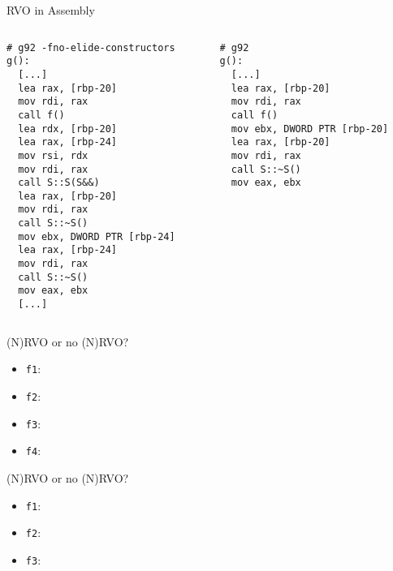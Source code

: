\begin{frame}[fragile]{RVO in Assembly}
    \begin{columns}[t]
        \begin{column}{.45\textwidth}
            \begin{lstlisting}[language={},morekeywords={rdi}]
# g92 -fno-elide-constructors
g():
  [...]
  lea rax, [rbp-20]
  mov rdi, rax
  call f()
  lea rdx, [rbp-20]
  lea rax, [rbp-24]
  mov rsi, rdx
  mov rdi, rax
  call S::S(S&&)
  lea rax, [rbp-20]
  mov rdi, rax
  call S::~S()
  mov ebx, DWORD PTR [rbp-24]
  lea rax, [rbp-24]
  mov rdi, rax
  call S::~S()
  mov eax, ebx
  [...]      
            \end{lstlisting}
        \end{column}
        \begin{column}{.45\textwidth}
            \begin{lstlisting}[language={},morekeywords={rdi}]
# g92
g():
  [...]
  lea rax, [rbp-20]
  mov rdi, rax
  call f()
  mov ebx, DWORD PTR [rbp-20]
  lea rax, [rbp-20]
  mov rdi, rax
  call S::~S()
  mov eax, ebx
            \end{lstlisting}
        \end{column}
    \end{columns}
\end{frame}

\begin{frame}[fragile]{(N)RVO or no (N)RVO?}
    \begin{itemize}
        \item \texttt{f1}: \only<1>{???}
        \item \texttt{f2}: 
        \item \texttt{f3}: \only<1>{???}
        \item \texttt{f4}: 
    \end{itemize}
\end{frame}

\begin{frame}[fragile]{(N)RVO or no (N)RVO?}
    \begin{itemize}
        \item \texttt{f1}: 
        \item \texttt{f2}: 
        \item \texttt{f3}: 
    \end{itemize}
\end{frame}

